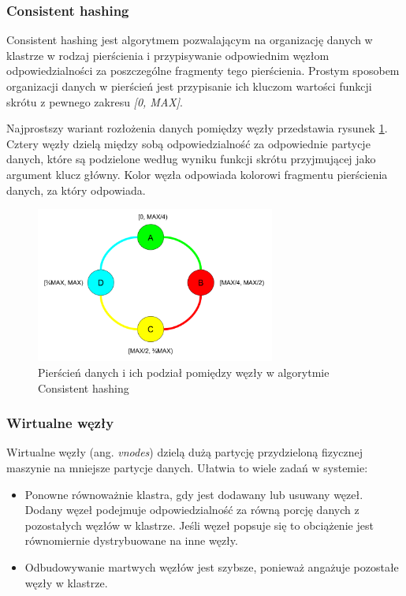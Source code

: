 \subsubsection{Consistent hashing}

Consistent hashing jest algorytmem pozwalającym na organizację danych w klastrze w rodzaj pierścienia i przypisywanie odpowiednim węzłom odpowiedzialności za poszczególne fragmenty tego pierścienia. 
Prostym sposobem organizacji danych w pierścień jest przypisanie ich kluczom wartości funkcji skrótu z pewnego zakresu \textit{[0, MAX]}.

Najprostszy wariant rozłożenia danych pomiędzy węzły przedstawia rysunek \ref{fig:cassandraConsistenHashing}.
Cztery węzły dzielą między sobą odpowiedzialność za odpowiednie partycje danych, które są podzielone według wyniku funkcji skrótu przyjmującej jako argument klucz główny.
Kolor węzła odpowiada kolorowi fragmentu pierścienia danych, za który odpowiada.

\begin{figure}[!ht]
\centering
\includegraphics[width=0.7\textwidth]{figures/consisten_hashing.png}
\caption{Pierścień danych i ich podział pomiędzy węzły w algorytmie Consistent hashing}
\label{fig:cassandraConsistenHashing}
\end{figure}

\subsubsection{Wirtualne węzły}

Wirtualne węzły (ang. \textit{vnodes}) dzielą dużą partycję przydzieloną fizycznej maszynie na mniejsze partycje danych.
Ułatwia to wiele zadań w systemie:
\begin{itemize}
    \item Ponowne równoważnie klastra, gdy jest dodawany lub usuwany węzeł.
    Dodany węzeł podejmuje odpowiedzialność za równą porcję danych z pozostałych węzłów w klastrze.
    Jeśli węzeł popsuje się to obciążenie jest równomiernie dystrybuowane na inne węzły.
    \item Odbudowywanie martwych węzłów jest szybsze, ponieważ angażuje pozostałe węzły w klastrze.
\end{itemize}

